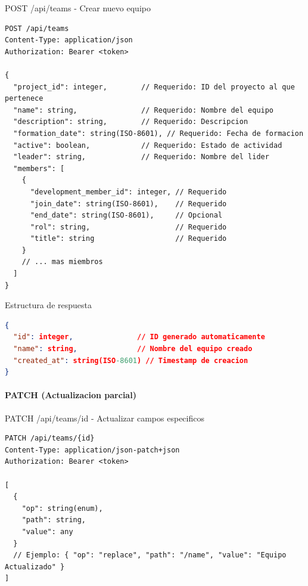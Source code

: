 \documentclass[11pt,a4paper]{article}
\begin{document}
\begin{center}
	\begin{minipage}{\textwidth}
		\begin{codebox}{POST /api/teams - Crear nuevo equipo}
			\begin{lstlisting}[language=HTTP]
POST /api/teams
Content-Type: application/json
Authorization: Bearer <token>

{
  "project_id": integer,        // Requerido: ID del proyecto al que pertenece
  "name": string,               // Requerido: Nombre del equipo
  "description": string,        // Requerido: Descripcion
  "formation_date": string(ISO-8601), // Requerido: Fecha de formacion
  "active": boolean,            // Requerido: Estado de actividad
  "leader": string,             // Requerido: Nombre del lider
  "members": [
    {
      "development_member_id": integer, // Requerido
      "join_date": string(ISO-8601),    // Requerido
      "end_date": string(ISO-8601),     // Opcional
      "rol": string,                    // Requerido
      "title": string                   // Requerido
    }
    // ... mas miembros
  ]
}
\end{lstlisting}
		\end{codebox}
	\end{minipage}
\end{center}

\begin{center}
	\begin{minipage}{\textwidth}
		\begin{codebox}{Estructura de respuesta}
			\begin{lstlisting}[language=json]
{
  "id": integer,               // ID generado automaticamente
  "name": string,              // Nombre del equipo creado
  "created_at": string(ISO-8601) // Timestamp de creacion
}
\end{lstlisting}
		\end{codebox}
	\end{minipage}
\end{center}





\paragraph{PATCH (Actualizacion parcial)}

\begin{center}
	\begin{minipage}{\textwidth}
		\begin{codebox}{PATCH /api/teams/{id} - Actualizar campos especificos}
			\begin{lstlisting}[language=HTTP]
PATCH /api/teams/{id}
Content-Type: application/json-patch+json
Authorization: Bearer <token>

[
  {
    "op": string(enum), 
    "path": string, 
    "value": any 
  }
  // Ejemplo: { "op": "replace", "path": "/name", "value": "Equipo Actualizado" }
]
\end{lstlisting}
		\end{codebox}
	\end{minipage}
\end{center}
\end{document}
